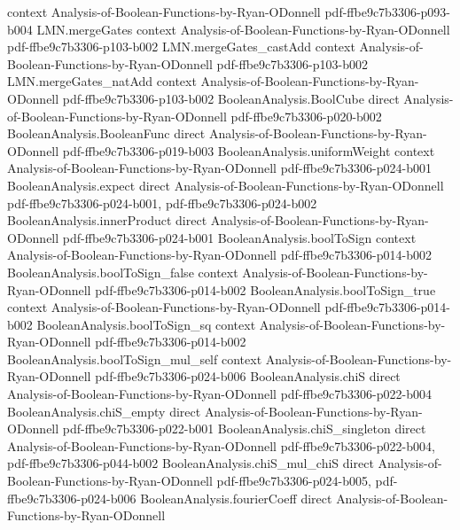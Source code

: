 \begin{theorem}
  {context}
  {Analysis-of-Boolean-Functions-by-Ryan-ODonnell}
  {pdf-ffbe9c7b3306-p093-b004}
\proofstep
  {LMN.mergeGates}
  {context}
  {Analysis-of-Boolean-Functions-by-Ryan-ODonnell}
  {pdf-ffbe9c7b3306-p103-b002}
\proofstep
  {LMN.mergeGates_castAdd}
  {context}
  {Analysis-of-Boolean-Functions-by-Ryan-ODonnell}
  {pdf-ffbe9c7b3306-p103-b002}
\proofstep
  {LMN.mergeGates_natAdd}
  {context}
  {Analysis-of-Boolean-Functions-by-Ryan-ODonnell}
  {pdf-ffbe9c7b3306-p103-b002}
\proofstep
  {BooleanAnalysis.BoolCube}
  {direct}
  {Analysis-of-Boolean-Functions-by-Ryan-ODonnell}
  {pdf-ffbe9c7b3306-p020-b002}
\proofstep
  {BooleanAnalysis.BooleanFunc}
  {direct}
  {Analysis-of-Boolean-Functions-by-Ryan-ODonnell}
  {pdf-ffbe9c7b3306-p019-b003}
\proofstep
  {BooleanAnalysis.uniformWeight}
  {context}
  {Analysis-of-Boolean-Functions-by-Ryan-ODonnell}
  {pdf-ffbe9c7b3306-p024-b001}
\proofstep
  {BooleanAnalysis.expect}
  {direct}
  {Analysis-of-Boolean-Functions-by-Ryan-ODonnell}
  {pdf-ffbe9c7b3306-p024-b001,
    pdf-ffbe9c7b3306-p024-b002}
\proofstep
  {BooleanAnalysis.innerProduct}
  {direct}
  {Analysis-of-Boolean-Functions-by-Ryan-ODonnell}
  {pdf-ffbe9c7b3306-p024-b001}
\proofstep
  {BooleanAnalysis.boolToSign}
  {context}
  {Analysis-of-Boolean-Functions-by-Ryan-ODonnell}
  {pdf-ffbe9c7b3306-p014-b002}
\proofstep
  {BooleanAnalysis.boolToSign_false}
  {context}
  {Analysis-of-Boolean-Functions-by-Ryan-ODonnell}
  {pdf-ffbe9c7b3306-p014-b002}
\proofstep
  {BooleanAnalysis.boolToSign_true}
  {context}
  {Analysis-of-Boolean-Functions-by-Ryan-ODonnell}
  {pdf-ffbe9c7b3306-p014-b002}
\proofstep
  {BooleanAnalysis.boolToSign_sq}
  {context}
  {Analysis-of-Boolean-Functions-by-Ryan-ODonnell}
  {pdf-ffbe9c7b3306-p014-b002}
\proofstep
  {BooleanAnalysis.boolToSign_mul_self}
  {context}
  {Analysis-of-Boolean-Functions-by-Ryan-ODonnell}
  {pdf-ffbe9c7b3306-p024-b006}
\proofstep
  {BooleanAnalysis.chiS}
  {direct}
  {Analysis-of-Boolean-Functions-by-Ryan-ODonnell}
  {pdf-ffbe9c7b3306-p022-b004}
\proofstep
  {BooleanAnalysis.chiS_empty}
  {direct}
  {Analysis-of-Boolean-Functions-by-Ryan-ODonnell}
  {pdf-ffbe9c7b3306-p022-b001}
\proofstep
  {BooleanAnalysis.chiS_singleton}
  {direct}
  {Analysis-of-Boolean-Functions-by-Ryan-ODonnell}
  {pdf-ffbe9c7b3306-p022-b004,
    pdf-ffbe9c7b3306-p044-b002}
\proofstep
  {BooleanAnalysis.chiS_mul_chiS}
  {direct}
  {Analysis-of-Boolean-Functions-by-Ryan-ODonnell}
  {pdf-ffbe9c7b3306-p024-b005,
    pdf-ffbe9c7b3306-p024-b006}
\proofstep
  {BooleanAnalysis.fourierCoeff}
  {direct}
  {Analysis-of-Boolean-Functions-by-Ryan-ODonnell}

\end{theorem}
